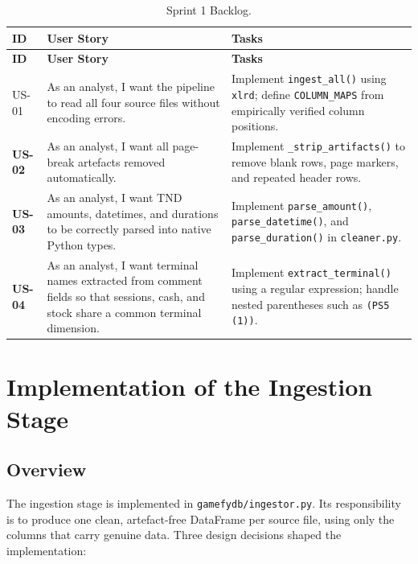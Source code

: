 \begin{longtable}{>{\bfseries}p{1.3cm} p{4.2cm} p{7cm}}
  \caption{Sprint 1 Backlog.\label{tab:sprint1_backlog}} \\
  \toprule
  \textbf{ID} & \textbf{User Story} & \textbf{Tasks} \\
  \midrule
  \endfirsthead
  \toprule
  \textbf{ID} & \textbf{User Story} & \textbf{Tasks} \\
  \midrule
  \endhead
  \bottomrule
  \endfoot

  US-01 & As an analyst, I want the pipeline to read all four source files
          without encoding errors.
        & Implement \texttt{ingest\_all()} using \texttt{xlrd}; define
          \texttt{COLUMN\_MAPS} from empirically verified column positions. \\[4pt]

  US-02 & As an analyst, I want all page-break artefacts removed automatically.
        & Implement \texttt{\_strip\_artifacts()} to remove blank rows, page
          markers, and repeated header rows. \\[4pt]

  US-03 & As an analyst, I want TND amounts, datetimes, and durations to be
          correctly parsed into native Python types.
        & Implement \texttt{parse\_amount()}, \texttt{parse\_datetime()}, and
          \texttt{parse\_duration()} in \texttt{cleaner.py}. \\[4pt]

  US-04 & As an analyst, I want terminal names extracted from comment fields so
          that sessions, cash, and stock share a common terminal dimension.
        & Implement \texttt{extract\_terminal()} using a regular expression;
          handle nested parentheses such as \texttt{(PS5\,(1))}. \\
\end{longtable}

\section{Implementation of the Ingestion Stage}

\subsection{Overview}

The ingestion stage is implemented in \texttt{gamefydb/ingestor.py}. Its
responsibility is to produce one clean, artefact-free DataFrame per source file,
using only the columns that carry genuine data. Three design decisions shaped the
implementation:

